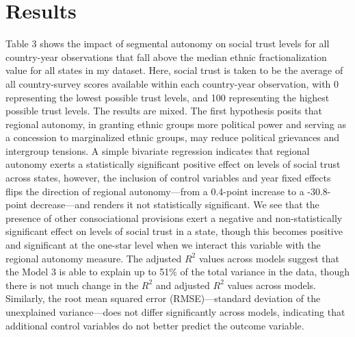 \documentclass[12pt]{article}
\begin{document}
\section{Results}
Table 3 shows the impact of segmental autonomy on social trust levels for all country-year observations that fall above the median ethnic fractionalization value for all states in my dataset. Here, social trust is taken to be the average of all country-survey scores available within each country-year observation, with 0 representing the lowest possible trust levels, and 100 representing the highest possible trust levels. The results are mixed. The first hypothesis posits that regional autonomy, in granting ethnic groups more political power and serving as a concession to marginalized ethnic groups, may reduce political grievances and intergroup tensions. A simple bivariate regression indicates that regional autonomy exerts a statistically significant positive effect on levels of social trust across states, however, the inclusion of control variables and year fixed effects flips the direction of regional autonomy---from a 0.4-point increase to a -30.8-point decrease---and renders it not statistically significant. We see that the presence of other consociational provisions exert a negative and non-statistically significant effect on levels of social trust in a state, though this becomes positive and significant at the one-star level when we interact this variable with the regional autonomy measure. The adjusted $R^2$ values across models suggest that the Model 3 is able to explain up to 51\% of the total variance in the data, though there is not much change in the $R^2$ and adjusted $R^2$ values across models. Similarly, the root mean squared error (RMSE)---standard deviation of the unexplained variance---does not differ significantly across models, indicating that additional control variables do not better predict the outcome variable.  
\end{document}
